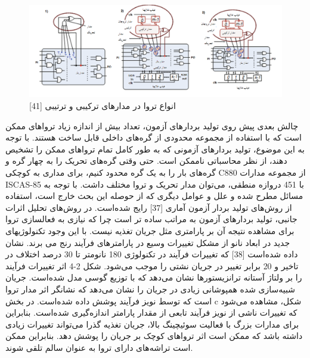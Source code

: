 \begin{figure}
\begin{center}
\includegraphics[scale=.5]{figs/fig2-4.png}
\caption{انواع تروا در مدارهای ترکیبی و ترتیبی [41]}
\label{fig2-4}
\end{center}
\end{figure}
 
چالش بعدی پیش روی تولید بردارهای آزمون، تعداد بیش از اندازه زیاد تروا‌های ممکن است که با استفاده از مجموعه محدودی از گره‌های داخلی قابل ساخت هستند. با توجه به این موضوع، تولید بردارهای آزمونی که به طور کامل تمام تروا‌های ممکن را تشخیص دهند، از نظر محاسباتی ناممکن است. حتی وقتی گره‌های تحریک را به چهار گره و گره‌های بار را به یک گره محدود کنیم، برای مداری به کوچکی C880  از مجموعه مدارات ISCAS-85 با 451 دروازه منطقی، می‌توان  مدار تحریک و  تروا مختلف داشت. با توجه به مسائل مطرح شده و علل و عوامل دیگری که از حوصله این بحث خارج است، استفاده از روش‌های تولید بردار آزمون آماری [37] رایج شده‌است.
در روش‌های تحلیل اثرات جانبی، تولید بردارهای آزمون به مراتب ساده تر است چرا که نیازی به فعالسازی تروا برای مشاهده نتیجه آن بر پارامتری مثل جریان تغذیه نیست. با این وجود تکنولوژیهای جدید در ابعاد نانو از مشکل تغییرات وسیع در پارامترهای فرآیند رنج می برند. نشان داده شده‌است [38] که تغییرات فرآیند در تکنولوژی 180 نانومتر تا 30 درصد اختلاف در تاخیر و 20 برابر تغییر در جریان نشتی را موجب می‌شود. شکل 2-4 اثر تغییرات فرآیند را بر ولتاژ آستانه ترانزیستورها نشان می‌دهد که با توزیع گوسی مدل شده‌است. جریان شبیه‌سازی شده همپوشانی زیادی در جریان را نشان می‌دهد که نشانگر اثر مدار تروا است که توسط نویز فرآیند پوشش داده شده‌است. در بخش c شکل، مشاهده می‌شود که تغییرات ناشی از نویز فرآیند تابعی از مقدار پارامتر اندازه‌گیری شده‌است. بنابراین برای مدارات بزرگ با فعالیت سوئیچینگ بالا، جریان تغذیه گذرا می‌تواند تغییرات زیادی داشته باشد که ممکن است اثر تروا‌های کوچک بر جریان را پوشش دهد. بنابراین ممکن است تراشه‌های دارای تروا به عنوان سالم تلقی شوند. 
 
